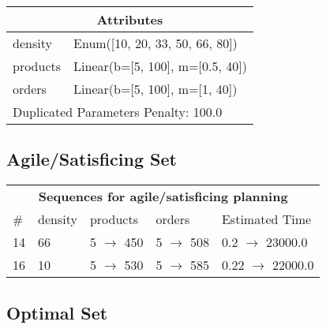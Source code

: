 \documentclass{article}
\begin{document}
                    \begin{center}
                    \begin{tabular}{p{}p{}}
                    \multicolumn{2}{c}{\bf \large Attributes}\\\midrule
                    density & Enum([10, 20, 33, 50, 66, 80])\\
products & Linear(b=[5, 100], m=[0.5, 40])\\
orders & Linear(b=[5, 100], m=[1, 40])
                    
                     \\\midrule
                    \multicolumn{2}{l}{Duplicated Parameters Penalty: 100.0}
                    \end{tabular}
                    \end{center}
                
                         \subsection*{Agile/Satisficing Set}

                        \begin{center}
                        \begin{tabular}{l|l|l|l|l}
                        \multicolumn{5}{c}{\bf \large Sequences for agile/satisficing planning}\\
                        \# & density & products & orders & Estimated Time\\\midrule
                        14&66&5 $\rightarrow$ 450&5 $\rightarrow$ 508&0.2 $\rightarrow$ 23000.0\\
16&10&5 $\rightarrow$ 530&5 $\rightarrow$ 585&0.22 $\rightarrow$ 22000.0
                        \end{tabular}
                        \end{center}
                    
                            \subsection*{Optimal Set}
\end{document}
